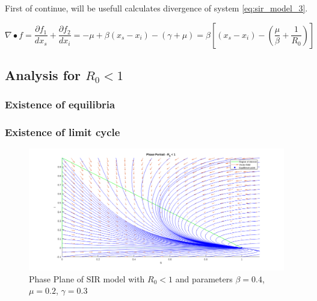 First of continue, will be usefull calculates divergence of system \ref{eq:sir_model_3}.

\begin{equation}
\label{eq:divergence}
    \nabla\bullet f = \frac{\partial f_1}{dx_s} + \frac{\partial f_2}{dx_i}=-\mu+\beta (x_s - x_i) -(\gamma + \mu)=\beta\left[(x_s - x_i) - \left(\frac{\mu}{\beta} + \frac{1}{R_0}\right)\right]
\end{equation}

\subsection{Analysis for $R_0 < 1$}
\subsubsection{Existence of equilibria}

\subsubsection{Existence of limit cycle}


\begin{figure}[h!]
    \centering
    \includegraphics[scale=0.45]{Figure/pp_R0_minor_1.png}
    \caption{Phase Plane of SIR model with $R_0 < 1$ and parameters $\beta = 0.4$, $\mu = 0.2$, $\gamma=0.3$}
    \label{fig:phase_plane_r0_minor_1}
\end{figure}

